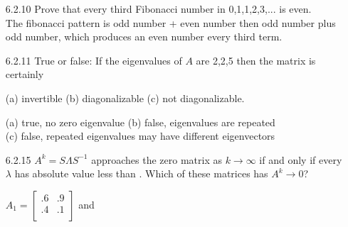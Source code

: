 \documentclass[10pt,twoside,reqno]{article}
\begin{document}
\begin{enumerate}
{%
{\addtolength{\leftskip}{5mm}
. \\
}
\vspace{3mm}
}
\item[6.2.10] Prove that every third Fibonacci number in 0,1,1,2,3,... is even.\\ \vspace{2mm}
{\addtolength{\leftskip}{5mm}
The fibonacci pattern is odd number + even number then odd number plus odd number, which produces an even number every third term. \\
}
\vspace{3mm}
\item[6.2.11] True or false: If the eigenvalues of $A$ are 2,2,5 then the matrix is certainly \\ 
\begin{center}
(a) invertible \hspace{10mm} (b) diagonalizable \hspace{10mm} (c) not diagonalizable. \\
\end{center}
\vspace{2mm}
{\addtolength{\leftskip}{5mm}
(a) true, no zero eigenvalue \hspace{4mm} (b) false, eigenvalues are repeated \\ (c) false, repeated eigenvalues may have different eigenvectors \\
}
\vspace{3mm}
\item[6.2.15] $A^k=S \Lambda S^{-1}$ approaches the zero matrix as $k \rightarrow \infty$ if and only if every $\lambda$ has absolute value less than \underline{\hspace{10mm}}. Which of these matrices has $A^k \rightarrow 0$? \\ 
\begin{center}
$
A_1=
\begin{bmatrix}
.6&.9\\
.4&.1\\
\end{bmatrix}
$
\hspace{8mm} and \hspace{8mm}

\end{center}
\end{enumerate}
\end{document}
